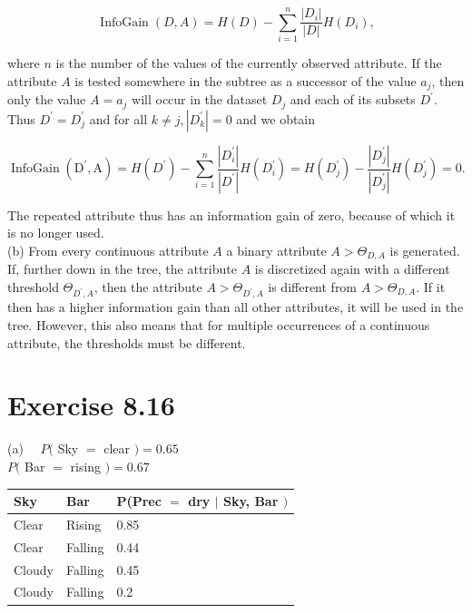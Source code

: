 \documentclass[10pt]{book}
\begin{document}
$$
\operatorname{InfoGain}(D, A)=H(D)-\sum_{i=1}^{n} \frac{\left|D_{i}\right|}{|D|} H\left(D_{i}\right),
$$

where $n$ is the number of the values of the currently observed attribute. If the attribute $A$ is tested somewhere in the subtree as a successor of the value $a_{j}$, then only the value $A=a_{j}$ will occur in the dataset $D_{j}$ and each of its subsets $D^{\prime}$. Thus $D^{\prime}=D_{j}^{\prime}$ and for all $k \neq j,\left|D_{k}^{\prime}\right|=0$ and we obtain

$$
\operatorname{InfoGain}\left(\mathrm{D}^{\prime}, \mathrm{A}\right)=H\left(D^{\prime}\right)-\sum_{i=1}^{n} \frac{\left|D_{i}^{\prime}\right|}{\left|D^{\prime}\right|} H\left(D_{i}^{\prime}\right)=H\left(D_{j}^{\prime}\right)-\frac{\left|D_{j}^{\prime}\right|}{\left|D_{j}^{\prime}\right|} H\left(D_{j}^{\prime}\right)=0 .
$$

The repeated attribute thus has an information gain of zero, because of which it is no longer used.\\
(b) From every continuous attribute $A$ a binary attribute $A>\Theta_{D, A}$ is generated. If, further down in the tree, the attribute $A$ is discretized again with a different threshold $\Theta_{D^{\prime}, A}$, then the attribute $A>\Theta_{D^{\prime}, A}$ is different from $A>\Theta_{D, A}$. If it then has a higher information gain than all other attributes, it will be used in the tree. However, this also means that for multiple occurrences of a continuous attribute, the thresholds must be different.

\section*{Exercise 8.16}
(a) $\quad P($ Sky $=$ clear $)=0.65$\\
$P($ Bar $=$ rising $)=0.67$

\begin{center}
\begin{tabular}{lll}
Sky & Bar & P(Prec $=$ dry $\mid$ Sky, Bar $)$ \\

\hline
Clear & Rising & 0.85 \\
\hline
Clear & Falling & 0.44 \\
\hline
Cloudy & Falling & 0.45 \\
\hline
Cloudy & Falling & 0.2 \\
\hline
\end{tabular}
\end{center}
\end{document}
